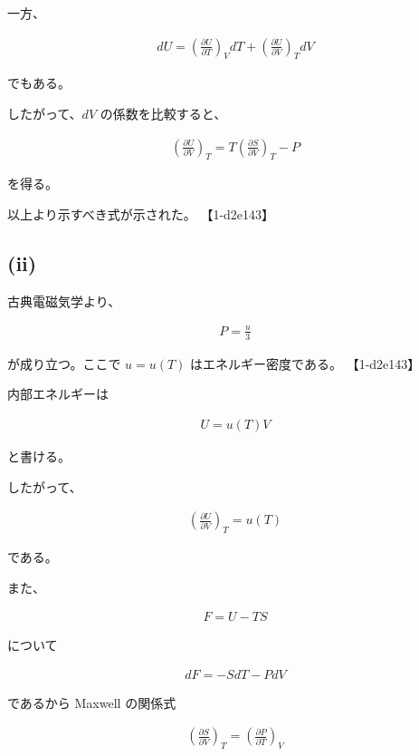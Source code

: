 \documentclass[platex,dvipdfmx,a4paper]{jsarticle}
\begin{document}
一方、

\begin{align*}
dU
=
\left(
\frac{\partial U}{\partial T}
\right)_V dT
+
\left(
\frac{\partial U}{\partial V}
\right)_T dV
\end{align*}

でもある。

したがって、$dV$ の係数を比較すると、

\begin{align*}
\left(
\frac{\partial U}{\partial V}
\right)_T
=
T
\left(
\frac{\partial S}{\partial V}
\right)_T
-P
\end{align*}

を得る。

以上より示すべき式が示された。 【1-d2e143】

\subsection{(ii)}

古典電磁気学より、

\begin{align*}
P=\frac{u}{3}
\end{align*}

が成り立つ。ここで $u=u(T)$ はエネルギー密度である。 【1-d2e143】

内部エネルギーは

\begin{align*}
U=u(T)V
\end{align*}

と書ける。

したがって、

\begin{align*}
\left(
\frac{\partial U}{\partial V}
\right)_T
=
u(T)
\end{align*}

である。

また、

\begin{align*}
F=U-TS
\end{align*}

について

\begin{align*}
dF=-SdT-PdV
\end{align*}

であるから Maxwell の関係式

\begin{align*}
\left(
\frac{\partial S}{\partial V}
\right)_T
=
\left(
\frac{\partial P}{\partial T}
\right)_V
\end{align*}
\end{document}
